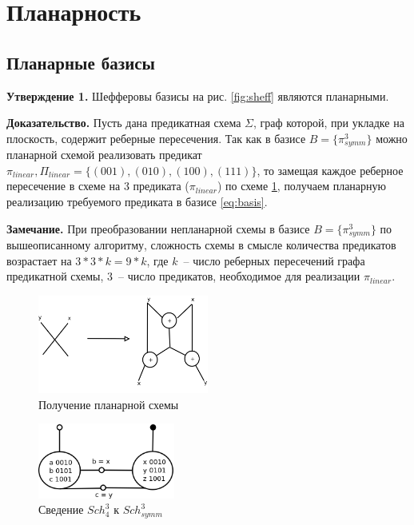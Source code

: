 \documentclass[12pt]{article}
\begin{document}
\section{Планарность}
\subsection{Планарные базисы}
\label{planar_basis}
\textbf{Утверждение 1.} Шефферовы базисы на рис. \ref{fig:sheff} являются планарными.

\textbf{Доказательство.} Пусть дана предикатная схема $\Sigma$, граф которой, при укладке на плоскость, содержит
реберные пересечения. Так как в базисе $B=\{\pi_{symm}^3\}$
\label{eq:basis} можно планарной схемой реализовать предикат 
$\pi_{linear}, \Pi_{linear} = \{ (001), (010), (100), (111) \}$, то замещая каждое реберное пересечение в схеме на 
3 предиката ($\pi_{linear}$) по схеме \ref{fig:xor}, получаем планарную реализацию требуемого предиката
в базисе \ref{eq:basis}.

\textbf{Замечание.} При преобразовании непланарной схемы в базисе $B=\{\pi_{symm}^3\}$
по вышеописанному алгоритму, сложность схемы в смысле количества предикатов возрастает на $3*3*k=9*k$, где $k$~-- число реберных
пересечений графа предикатной схемы, $3$~-- число предикатов, необходимое для реализации $\pi_{linear}$.


\begin{figure}[htb]
\centering
\includegraphics[width=0.5\textwidth]{intersection.png}
\caption{Получение планарной схемы}
\label{fig:xor}
\end{figure}


\begin{figure}[htb]
\centering
\includegraphics[width=0.4\textwidth]{scheff4.png}
\caption{Сведение $Sch_4^3$ к $Sch_{symm}^3$}
\label{fig:scheff3_4}
\end{figure}
\end{document}
